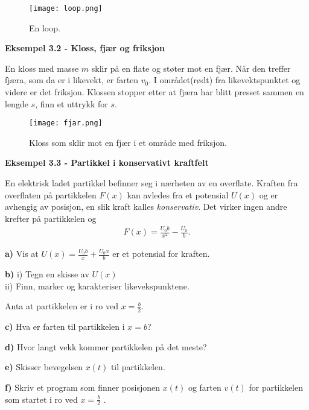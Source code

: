 \documentclass[11pt,a4paper]{article}
\numberwithin{equation}{section}
\begin{document}
\begin{figure}[h!]
\begin{center}
  \texttt{[image: loop.png]}
  \end{center}
  \caption{En loop.}
\end{figure}


\textbf{Eksempel 3.2 - Kloss, fjær og friksjon}

En kloss med masse $m$ sklir på en flate og støter mot en fjær. Når den treffer fjæra, som da er i likevekt, er farten $v_0$. I området(rødt) fra likevektspunktet og videre er det friksjon. Klossen stopper etter at fjæra har blitt presset sammen en lengde $s$, finn et uttrykk for $s$. 

\begin{figure}[h!]
\begin{center}
  \texttt{[image: fjar.png]}
  \end{center}
  \caption{Kloss som sklir mot en fjær i et område med friksjon.}
\end{figure}

\newpage
 

\textbf{Eksempel 3.3 - Partikkel i konservativt kraftfelt}

En elektrisk ladet partikkel befinner seg i nærheten av en overflate. Kraften fra overflaten på partikkelen  $F(x)$ kan avledes fra et potensial $U(x)$ og er avhengig av posisjon, en slik kraft kalles \emph{konservativ}. Det virker ingen andre krefter på partikkelen og 
\begin{align}
F(x) = \frac{U_0 b}{x^2} - \frac{U_0}{b}.
\end{align}

\textbf{a)} Vis at $U(x) = \frac{U_0 b}{x} + \frac{U_0 x}{b}$ er et potensial for kraften.

\textbf{b)} i) Tegn en skisse av $U(x)$ \\
ii) Finn, marker og karakteriser likevekspunktene. 

Anta at partikkelen er i ro ved $x = \frac{b}{2}$.

\textbf{c)} Hva er farten til partikkelen i $x=b$?

\textbf{d)} Hvor langt vekk kommer partikkelen på det meste? 

\textbf{e)} Skisser bevegelsen $x(t)$ til partikkelen.

\textbf{f)} Skriv et program som finner posisjonen $x(t)$ og farten $v(t)$ for partikkelen som startet i ro ved $x=\frac{b}{2}$ .

\newpage
\end{document}

